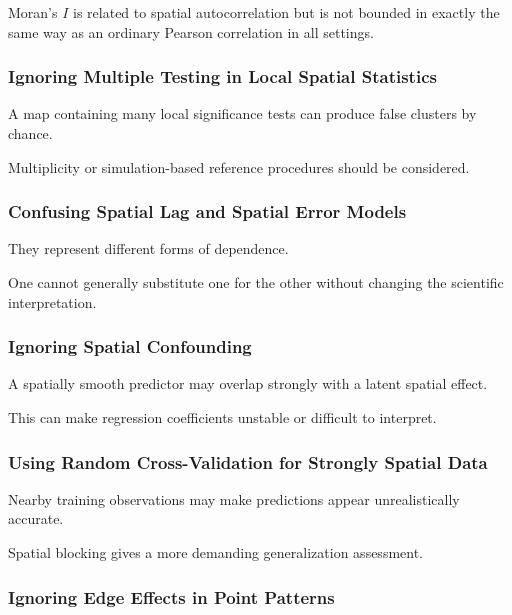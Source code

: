 Moran's \(I\) is related to spatial autocorrelation but is not bounded in
exactly the same way as an ordinary Pearson correlation in all settings.

\subsubsection{Ignoring Multiple Testing in Local Spatial Statistics}

A map containing many local significance tests can produce false
clusters by chance.

Multiplicity or simulation-based reference procedures should be
considered.

\subsubsection{Confusing Spatial Lag and Spatial Error Models}

They represent different forms of dependence.

One cannot generally substitute one for the other without changing the
scientific interpretation.

\subsubsection{Ignoring Spatial Confounding}

A spatially smooth predictor may overlap strongly with a latent spatial
effect.

This can make regression coefficients unstable or difficult to
interpret.

\subsubsection{Using Random Cross-Validation for Strongly Spatial Data}

Nearby training observations may make predictions appear unrealistically
accurate.

Spatial blocking gives a more demanding generalization assessment.

\subsubsection{Ignoring Edge Effects in Point Patterns}

